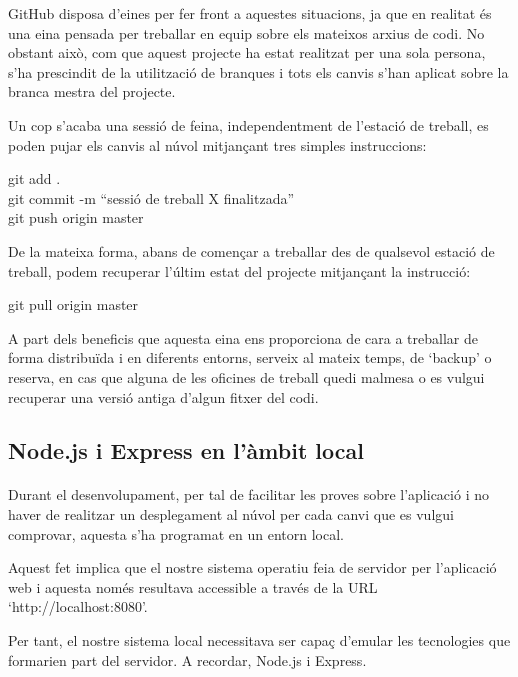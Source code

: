     GitHub disposa d'eines per fer front a aquestes situacions, ja que en realitat és una eina pensada per treballar en equip sobre els mateixos arxius de codi. No obstant això, com que aquest projecte ha estat realitzat per una sola persona, s'ha prescindit de la utilització de branques i tots els canvis s'han aplicat sobre la branca mestra del projecte.

    Un cop s'acaba una sessió de feina, independentment de l'estació de treball, es poden pujar els canvis al núvol mitjançant tres simples instruccions:

    \begin{displayquote}
        git add .\\
        git commit -m ``sessió de treball X finalitzada''\\
        git push origin master
    \end{displayquote}

    De la mateixa forma, abans de començar a treballar des de qualsevol estació de treball, podem recuperar l'últim estat del projecte mitjançant la instrucció:

    \begin{displayquote}
        git pull origin master
    \end{displayquote}

    A part dels beneficis que aquesta eina ens proporciona de cara a treballar de forma distribuïda i en diferents entorns, serveix al mateix temps, de `backup' o reserva, en cas que alguna de les oficines de treball quedi malmesa o es vulgui recuperar una versió antiga d'algun fitxer del codi.


    \subsection{Node.js i Express en l'àmbit local}

    \paragraph{}
    Durant el desenvolupament, per tal de facilitar les proves sobre l’aplicació i no haver de realitzar un desplegament al núvol per cada canvi que es vulgui comprovar, aquesta s'ha programat en un entorn local.

    Aquest fet implica que el nostre sistema operatiu feia de servidor per l'aplicació web i aquesta només resultava accessible a través de la URL `http://localhost:8080'.

    Per tant, el nostre sistema local necessitava ser capaç d'emular les tecnologies que formarien part del servidor. A recordar, Node.js i Express.

